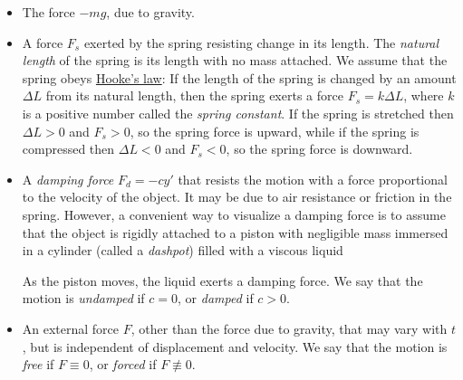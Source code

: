 \documentclass{ximera}
\begin{document}
\begin{itemize}
\item The force $-mg$, due to gravity.
 
\item A force $F_s$ exerted by the spring resisting change in its
length. The \textit{natural length} of the spring is its length with
no mass attached. We assume that the spring obeys
\href{http://www-history.mcs.st-and.ac.uk/Mathematicians/Hooke.html}
{Hooke's law}:
If the length of the spring is changed by an amount $\Delta L$
from its natural length,  then the spring exerts a force $F_s=k\Delta
L$, where $k$ is a positive number called the \textit{spring constant}.
If the spring is stretched then  $\Delta L>0$ and $F_s>0$, so the
spring force is upward, while if the spring is compressed then $\Delta
L<0$ and $F_s<0$, so the spring force is downward.
 
\item A \textit{damping force} $F_d=-cy'$ that resists the motion with
a force proportional to the velocity of the object. It may be due to
air resistance or friction in the spring. However, a convenient way to
visualize a damping force is to assume that the object is rigidly
attached to a piston with negligible mass immersed in a cylinder
(called a \textit{dashpot}) filled with a viscous liquid

\begin{center}
\end{center}

 
As the piston moves, the liquid exerts a
damping force. We say that the motion is \textit{undamped} if $c=0$, or
\textit{damped} if $c>0$.
 
 
\item An external force $F$, other than the force due to gravity, that
may vary with $t$, but is independent of displacement and velocity. We
say that the motion is \textit{free} if $F\equiv0$, or \textit{forced}
if $F\not\equiv0$.
 
\end{itemize}
 
\end{document}
